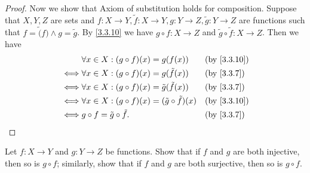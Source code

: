 \begin{proof}
  Now we show that Axiom of substitution holds for composition.
  Suppose that \(X, Y, Z\) are sets and \(f : X \to Y, \tilde{f} : X \to Y, g : Y \to Z, \tilde{g} : Y \to Z\) are functions such that \(f = \tilde(f) \land g = \tilde{g}\).
  By \cref{3.3.10} we have \(g \circ f : X \to Z\) and \(\tilde{g} \circ \tilde{f} : X \to Z\).
  Then we have
  \begin{align*}
         & \forall x \in X : (g \circ f)(x) = g(f(x))                        &  & \text{(by \cref{3.3.10})} \\
    \iff & \forall x \in X : (g \circ f)(x) = g(\tilde{f}(x))                &  & \text{(by \cref{3.3.7})}  \\
    \iff & \forall x \in X : (g \circ f)(x) = \tilde{g}(\tilde{f}(x))        &  & \text{(by \cref{3.3.7})}  \\
    \iff & \forall x \in X : (g \circ f)(x) = (\tilde{g} \circ \tilde{f})(x) &  & \text{(by \cref{3.3.10})} \\
    \iff & g \circ f = \tilde{g} \circ \tilde{f}.                            &  & \text{(by \cref{3.3.7})}
  \end{align*}
\end{proof}

\begin{ex}\label{ex:3.3.2}
  Let \(f : X \to Y\) and \(g : Y \to Z\) be functions.
  Show that if \(f\) and \(g\) are both injective, then so is \(g \circ f\);
  similarly, show that if \(f\) and \(g\) are both surjective, then so is \(g \circ f\).
\end{ex}


